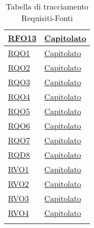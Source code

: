 \begin{longtable}{|>{\centering}m{5cm}|m{5cm}<{\centering}|}
\hyperlink{RFO13}{RFO13} & \hyperlink{Capitolato}{Capitolato}\\
\hline

 \hyperlink{RQO1}{RQO1} & \hyperlink{Capitolato}{Capitolato}\\
\hline

 \hyperlink{RQO2}{RQO2} & \hyperlink{Capitolato}{Capitolato}\\
\hline

 \hyperlink{RQO3}{RQO3} & \hyperlink{Capitolato}{Capitolato}\\
\hline

 \hyperlink{RQO4}{RQO4} & \hyperlink{Capitolato}{Capitolato}\\
\hline

 \hyperlink{RQO5}{RQO5} & \hyperlink{Capitolato}{Capitolato}\\
\hline

 \hyperlink{RQO6}{RQO6} & \hyperlink{Capitolato}{Capitolato}\\
\hline

 \hyperlink{RQO7}{RQO7} & \hyperlink{Capitolato}{Capitolato}\\
\hline

 \hyperlink{RQD8}{RQD8} & \hyperlink{Capitolato}{Capitolato}\\
\hline

 \hyperlink{RVO1}{RVO1} & \hyperlink{Capitolato}{Capitolato}\\
\hline

 \hyperlink{RVO2}{RVO2} & \hyperlink{Capitolato}{Capitolato}\\
\hline

 \hyperlink{RVO3}{RVO3} & \hyperlink{Capitolato}{Capitolato}\\
\hline

 \hyperlink{RVO4}{RVO4} & \hyperlink{Capitolato}{Capitolato}\\
\hline

\caption[Tabella di tracciamento Requisiti-Fonti]{Tabella di tracciamento Requisiti-Fonti}
\label{tabella:requi-fonti}
\end{longtable}
\clearpage
